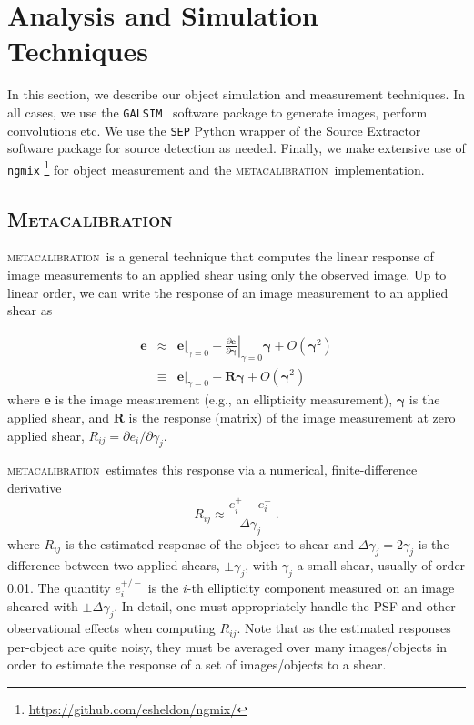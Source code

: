 \documentclass[fleqn,useAMS,usenatbib]{mnras}
\newcommand{\galsim}{\texttt{GALSIM}}
\newcommand{\ngmix}{\texttt{ngmix}}
\newcommand{\mcal}{\textsc{metacalibration}}
\begin{document}
\section{Analysis and Simulation Techniques}
\label{sec:sims}

In this section, we describe our object simulation and measurement techniques.
In all cases, we use the \galsim\ \citep{GALSIM2015} software package to
generate images, perform convolutions etc. We use the \texttt{SEP} \citep{sep}
Python wrapper of the Source Extractor software package \citep{Bertin96} for
source detection as needed. Finally, we make extensive use of \ngmix
\footnote{\url{https://github.com/esheldon/ngmix/}} for object measurement and
the \mcal\ implementation.

\subsection{\textsc{Metacalibration}}

\mcal\ is a general technique that computes the linear response of image
measurements to an applied shear using only the observed image. Up to linear
order, we can write the response of an image measurement to an applied shear as

\begin{eqnarray}
\boldsymbol{e} & \approx & \left.\boldsymbol{e}\right|_{\gamma=0} +
                           \left.\frac{\partial \boldsymbol{e}}{\partial\boldsymbol\gamma}\right|_{\gamma=0} \boldsymbol\gamma +
                           O(\boldsymbol\gamma^2)\nonumber\\
               & \equiv  & \left.\boldsymbol{e}\right|_{\gamma=0} +
                           \boldsymbol{R} \boldsymbol\gamma +
                           O(\boldsymbol\gamma^2)
\end{eqnarray}
where $\boldsymbol{e}$ is the image measurement (e.g., an ellipticity
measurement), $\boldsymbol\gamma$ is the applied shear, and $\boldsymbol{R}$ is
the response (matrix) of the image measurement at zero applied shear,
$R_{ij}=\partial e_i /\partial \gamma_j$.

\mcal\ estimates this response via a numerical, finite-difference derivative
\begin{displaymath}
R_{ij} \approx \frac{e_i^{+} - e_i^{-}}{\Delta\gamma_j}\ .
\end{displaymath}
where $R_{ij}$ is the estimated response of the object to shear
and $\Delta\gamma_j = 2 \gamma_j$ is the difference between two applied
shears, $\pm \gamma_j$, with $\gamma_j$ a small shear, usually of order 0.01. The quantity
$e_i^{+/-}$ is the $i$-th ellipticity component measured on an image sheared with
$\pm\Delta\gamma_j$. In detail, one must appropriately handle the PSF and
other observational effects when computing $R_{ij}$. Note that as the
estimated responses per-object are quite noisy, they must be averaged
over many images/objects in order to estimate the response of a set of
images/objects to a shear.
\end{document}
